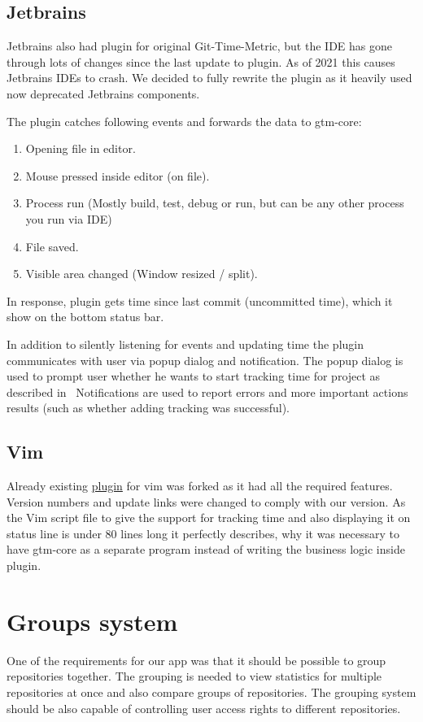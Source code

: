 \subsection{Jetbrains}\label{subsec:jetbrains-plugin}
Jetbrains also had plugin for original Git-Time-Metric, but the IDE has gone through lots of changes since the last update to plugin.
As of 2021 this causes Jetbrains IDEs to crash.
We decided to fully rewrite the plugin as it heavily used now deprecated Jetbrains components.

The plugin catches following events and forwards the data to gtm-core:
\begin{enumerate}
    \item Opening file in editor.
    \item Mouse pressed inside editor (on file).
    \item Process run (Mostly build, test, debug or run, but can be any other process you run via IDE)
    \item File saved.
    \item Visible area changed (Window resized / split).
\end{enumerate}

In response, plugin gets time since last commit (uncommitted time), which it show on the bottom status bar.

In addition to silently listening for events and updating time the plugin communicates with user via popup dialog and notification.
The popup dialog is used to prompt user whether he wants to start tracking time for project as described in~
Notifications are used to report errors and more important actions results (such as whether adding tracking was successful).

\subsection{Vim}\label{subsec:vim-plugin}
Already existing \href{https://github.com/git-time-metric/gtm-vim-plugin}{plugin} for vim was forked as it had all the required features.
Version numbers and update links were changed to comply with our version.
As the Vim script file to give the support for tracking time and also displaying it on status line is under 80 lines long
it perfectly describes, why it was necessary to have gtm-core as a separate program instead of writing the business logic inside plugin.


\section{Groups system}\label{sec:group-system}
One of the requirements for our app was that it should be possible to group repositories together.
The grouping is needed to view statistics for multiple repositories at once and also compare groups of repositories.
The grouping system should be also capable of controlling user access rights to different repositories.

